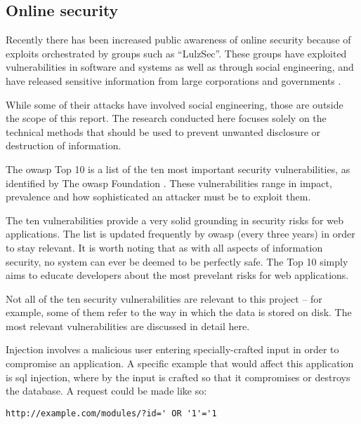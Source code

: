 
\subsection{Online security}
\label{sec:research_security}

Recently there has been increased public awareness of online security because
of exploits orchestrated by groups such as ``LulzSec''. These groups have
exploited vulnerabilities in software and systems as well as through social
engineering, and have released sensitive information from large corporations
and governments \cite{ASATrendsinDataBreaches_2012}.

While some of their attacks have involved social engineering, those are
outside the scope of this report. The research conducted here focuses solely
on the technical methods that should be used to prevent unwanted disclosure or
destruction of information.

The \gls{owasp} Top 10 is a list of the ten most important security
vulnerabilities, as identified by The \gls{owasp} Foundation
\cite{OWASPTop10_2010}. These vulnerabilities range in impact, prevalence and
how sophisticated an attacker must be to exploit them.

The ten vulnerabilities provide a very solid grounding in security risks for
web applications. The list is updated frequently by \gls{owasp} (every three
years) in order to stay relevant. It is worth noting that as with all aspects
of information security, no system can ever be deemed to be perfectly safe.
The Top 10 simply aims to educate developers about the most prevelant risks
for web applications.

Not all of the ten security vulnerabilities are relevant to this project --
for example, some of them refer to the way in which the data is stored on
disk. The most relevant vulnerabilities are discussed in detail here.


Injection involves a malicious user entering specially-crafted input in order
to compromise an application. A specific example that would affect this
application is \gls{sql} injection, where by the input is crafted so that it
compromises or destroys the database. A request could be made like so:

\begin{lstlisting}
http://example.com/modules/?id=' OR '1'='1
\end{lstlisting}

